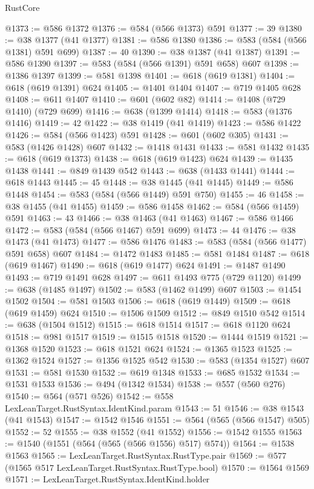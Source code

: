 \begin{lexlean}{RustCore}
\begin{coremodule}
@1373 := @586 @1372
@1376 := @584 (@566 @1373) @591
@1377 := 39
@1380 := @38 @1377 (@41 @1377)
@1381 := @586 @1380
@1386 := @583 (@584 (@566 @1381) @591 @699)
@1387 := 40
@1390 := @38 @1387 (@41 @1387)
@1391 := @586 @1390
@1397 := @583 (@584 (@566 @1391) @591 @658) @607
@1398 := @1386 @1397
@1399 := @581 @1398
@1401 := @618 (@619 @1381)
@1404 := @618 (@619 @1391) @624
@1405 := @1401 @1404
@1407 := @719 @1405 @628
@1408 := @611 @1407
@1410 := @601 (@602 @82)
@1414 := @1408 (@729 @1410) (@729 @699)
@1416 := @638 (@1399 @1414)
@1418 := @583 (@1376 @1416)
@1419 := 42
@1422 := @38 @1419 (@41 @1419)
@1423 := @586 @1422
@1426 := @584 (@566 @1423) @591
@1428 := @601 (@602 @305)
@1431 := @583 (@1426 @1428) @607
@1432 := @1418 @1431
@1433 := @581 @1432
@1435 := @618 (@619 @1373)
@1438 := @618 (@619 @1423) @624
@1439 := @1435 @1438
@1441 := @849 @1439 @542
@1443 := @638 (@1433 @1441)
@1444 := @618 @1443
@1445 := 45
@1448 := @38 @1445 (@41 @1445)
@1449 := @586 @1448
@1454 := @583 (@584 (@566 @1449) @591 @750)
@1455 := 46
@1458 := @38 @1455 (@41 @1455)
@1459 := @586 @1458
@1462 := @584 (@566 @1459) @591
@1463 := 43
@1466 := @38 @1463 (@41 @1463)
@1467 := @586 @1466
@1472 := @583 (@584 (@566 @1467) @591 @699)
@1473 := 44
@1476 := @38 @1473 (@41 @1473)
@1477 := @586 @1476
@1483 := @583 (@584 (@566 @1477) @591 @658) @607
@1484 := @1472 @1483
@1485 := @581 @1484
@1487 := @618 (@619 @1467)
@1490 := @618 (@619 @1477) @624
@1491 := @1487 @1490
@1493 := @719 @1491 @628
@1497 := @611 @1493 @775 (@729 @1120)
@1499 := @638 (@1485 @1497)
@1502 := @583 (@1462 @1499) @607
@1503 := @1454 @1502
@1504 := @581 @1503
@1506 := @618 (@619 @1449)
@1509 := @618 (@619 @1459) @624
@1510 := @1506 @1509
@1512 := @849 @1510 @542
@1514 := @638 (@1504 @1512)
@1515 := @618 @1514
@1517 := @618 @1120 @624
@1518 := @981 @1517
@1519 := @1515 @1518
@1520 := @1444 @1519
@1521 := @1368 @1520
@1523 := @618 @1521 @624
@1524 := @1365 @1523
@1525 := @1362 @1524
@1527 := @1356 @1525 @542
@1530 := @583 (@1354 @1527) @607
@1531 := @581 @1530
@1532 := @619 @1348
@1533 := @685 @1532
@1534 := @1531 @1533
@1536 := @494 (@1342 @1534)
@1538 := @557 (@560 @276)
@1540 := @564 (@571 @526)
@1542 := @558 LexLeanTarget.RustSyntax.IdentKind.param
@1543 := 51
@1546 := @38 @1543 (@41 @1543)
@1547 := @1542 @1546
@1551 := @564 (@565 (@566 @1547) @505)
@1552 := 52
@1555 := @38 @1552 (@41 @1552)
@1556 := @1542 @1555
@1563 := @1540 (@1551 (@564 (@565 (@566 @1556) @517) @574))
@1564 := @1538 @1563
@1565 := LexLeanTarget.RustSyntax.RustType.pair
@1569 := @577 (@1565 @517 LexLeanTarget.RustSyntax.RustType.bool)
@1570 := @1564 @1569
@1571 := LexLeanTarget.RustSyntax.IdentKind.holder

\end{coremodule}
\end{lexlean}
